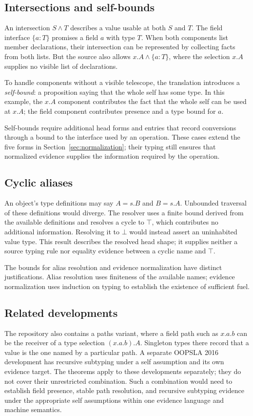 \subsection*{Intersections and self-bounds}
An intersection $S\wedge T$ describes a value usable at both $S$ and $T$.
The field interface $\{a:T\}$ promises a field $a$ with type $T$.
When both components list member declarations, their intersection can
be represented by collecting facts from both lists.
But the source also allows $x.A\wedge\{a:T\}$, where the selection
$x.A$ supplies no visible list of declarations.

To handle components without a visible telescope, the translation
introduces a \emph{self-bound}: a proposition
saying that the whole self has some type. In this example, the $x.A$
component contributes the fact that the whole self can be used at $x.A$;
the field component contributes presence and a type bound for $a$.

Self-bounds require additional head forms and entries that record
conversions through a bound to the interface used by an operation.
These cases extend the five forms in Section~\ref{sec:normalization};
their typing still ensures that normalized evidence supplies the
information required by the operation.

\subsection*{Cyclic aliases}
An object's type definitions may say $A=s.B$ and $B=s.A$.
Unbounded traversal of these definitions would diverge. The resolver
uses a finite bound derived from the available definitions and resolves
a cycle to $\top$, which contributes no additional information.
Resolving it to $\bot$ would instead assert an uninhabited value type.
This result describes the resolved head shape; it supplies neither a
source typing rule nor equality evidence between a cyclic name and
$\top$.

The bounds for alias resolution and evidence normalization have distinct
justifications. Alias resolution uses finiteness of the available names;
evidence normalization uses induction on typing to establish the
existence of sufficient fuel.

\subsection*{Related developments}
The repository also contains a paths variant, where a field path such as
$x.a.b$ can be the receiver of a type selection $(x.a.b).A$.
Singleton types there record that a value is the one named by a
particular path.
A separate OOPSLA 2016 development has recursive subtyping under a self
assumption and its own evidence target.
The theorems apply to these developments separately; they do not cover
their unrestricted combination. Such a combination would need to
establish field presence, stable path resolution, and recursive
subtyping evidence under the appropriate self assumptions within one
evidence language and machine semantics.

